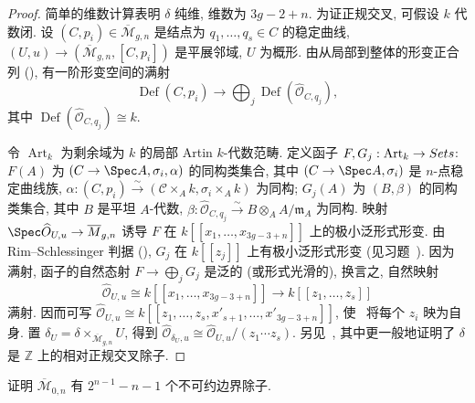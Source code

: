 \begin{proof}
简单的维数计算表明 $\delta$ 纯维, 维数为 $3g-2+n$. 为证正规交叉, 可假设 $k$ 代数闭. 设 $(C,\allowbreak p_i)\in\overline{\mathcal M}_{g,\allowbreak n}$ 是结点为 $q_1,\allowbreak \ldots,\allowbreak q_s\in C$ 的稳定曲线, $(U,\allowbreak u)\to(\overline{\mathcal M}_{g,\allowbreak n},\allowbreak [C,\allowbreak p_i])$ 是平展邻域, $U$ 为概形. 由从局部到整体的形变正合列 (), 有一阶形变空间的满射
\begin{equation}\label{src:6.6.20}
\operatorname{Def}(C,p_i)\to\bigoplus_j\operatorname{Def}(\widehat{\mathcal O}_{C,q_j}),
\end{equation}
其中 $\operatorname{Def}(\widehat{\mathcal O}_{C,\allowbreak q_j})\cong k$.

令 $\operatorname{Art}_k$ 为剩余域为 $k$ 的局部 Artin $k$-代数范畴. 定义函子 $F,\allowbreak G_j:\operatorname{Art}_k\to Sets$: $F(A)$ 为 $(\mathcal C\to\Spec A,\allowbreak \sigma_i,\allowbreak \alpha)$ 的同构类集合, 其中 $(\mathcal C\to\Spec A,\allowbreak \sigma_i)$ 是 $n$-点稳定曲线族, $\alpha:(C,\allowbreak p_i)\xrightarrow{\sim}(\mathcal C\times_A k,\allowbreak \sigma_i\times_A k)$ 为同构; $G_j(A)$ 为 $(B,\allowbreak \beta)$ 的同构类集合, 其中 $B$ 是平坦 $A$-代数, $\beta:\widehat{\mathcal O}_{C,\allowbreak q_j}\xrightarrow{\sim}B\otimes_A A/\mathfrak m_A$ 为同构. 映射 $\Spec\widehat{\mathcal O}_{U,\allowbreak u}\to\overline{\mathcal M}_{g,\allowbreak n}$ 诱导 $F$ 在 $k[[x_1,\allowbreak \ldots,\allowbreak x_{3g-3+n}]]$ 上的极小泛形式形变. 由 Rim--Schlessinger 判据 (), $G_j$ 在 $k[[z_j]]$ 上有极小泛形式形变 (见习题~). 因为~ 满射, 函子的自然态射 $F\to\bigoplus_jG_j$ 是泛的 (或形式光滑的), 换言之, 自然映射
\begin{equation}\label{src:6.6.21}
\widehat{\mathcal O}_{U,u}\cong k[[x_1,\ldots,x_{3g-3+n}]]\to k[[z_1,\ldots,z_s]]
\end{equation}
满射. 因而可写 $\widehat{\mathcal O}_{U,\allowbreak u}\cong k[[z_1,\allowbreak \ldots,\allowbreak z_s,\allowbreak x'_{s+1},\allowbreak \ldots,\allowbreak x'_{3g-3+n}]]$, 使~ 将每个 $z_i$ 映为自身. 置 $\delta_U=\delta\times_{\overline{\mathcal M}_{g,\allowbreak n}}U$, 得到 $\widehat{\mathcal O}_{\delta_U,\allowbreak u}\cong\widehat{\mathcal O}_{U,\allowbreak u}/(z_1\cdots z_s)$. 另见~\cite[定理 5.2]{DM69}, 其中更一般地证明了 $\delta$ 是 $\mathbb Z$ 上的相对正规交叉除子.
\end{proof}
\begin{exercise}\label{src:6.6.22}
证明 $\overline{\mathcal M}_{0,\allowbreak n}$ 有 $2^{n-1}-n-1$ 个不可约边界除子.
\end{exercise}
